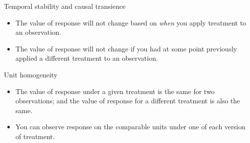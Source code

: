 \documentclass[xcolor={dvipsnames},handout]{beamer}
\begin{document}

\begin{frame}{Temporal stability and causal transience}

\begin{itemize}
\item The value of response will not change based on \textit{when} you apply treatment to an observation. 
\item The value of response will not change if you had at some point previously applied a different treatment to an observation. 
\end{itemize}

\end{frame}



\begin{frame}{Unit homogeneity}

\begin{itemize}
\item The value of response under a given treatment is the same for two observations; and the value of response for a different treatment is also the same. 
\item You can observe response on the comparable units under one of each version of treatment. 
\end{itemize}

\end{frame}


\end{document}
